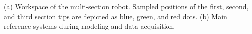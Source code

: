 \caption{(a) Workspace of the multi-section robot. Sampled positions of the first, second, and third section tips are depicted as blue, green, and red dots. (b) Main reference systems during modeling and data acquisition.}
